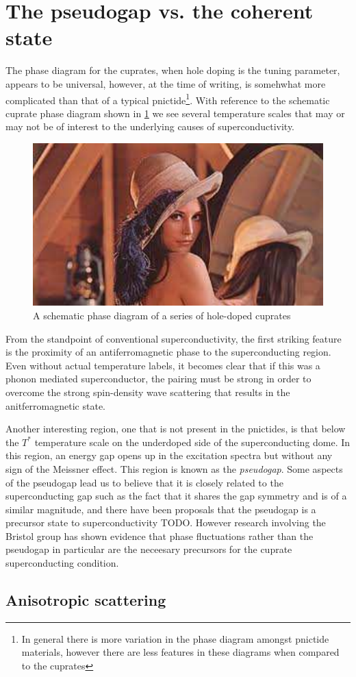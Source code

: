 
\section{The pseudogap vs. the coherent state}

The phase diagram for the cuprates, when hole doping is the tuning parameter, appears to be universal, however, at the time of writing, is somehwhat more complicated than that of a typical pnictide\footnote{In general there is more variation in the phase diagram amongst pnictide materials, however there are less features in these diagrams when compared to the cuprates}. With reference to the schematic cuprate phase diagram shown in \fig\ref{Fig:1:UniversalCupratePhaseDiagram} we see several temperature scales that may or may not be of interest to the underlying causes of \highTc superconductivity.
\begin{figure}[htbp]
    \begin{center}
        \includegraphics[scale=0.7]{Misc/TODO}
        \caption{A schematic phase diagram of a series of hole-doped cuprates}
        \label{Fig:1:UniversalCupratePhaseDiagram}
    \end{center}
\end{figure}
From the standpoint of conventional superconductivity, the first striking feature is the proximity of an antiferromagnetic phase to the superconducting region. Even without actual temperature labels, it becomes clear that if this was a phonon mediated superconductor, the pairing must be strong in order to overcome the strong spin-density wave scattering that results in the anitferromagnetic state.

Another interesting region, one that is not present in the pnictides, is that below the $T^*$ temperature scale on the underdoped side of the superconducting dome. In this region, an energy gap opens up in the excitation spectra but without any sign of the Meissner effect. This region is known as the \textit{pseudogap}. Some aspects of the pseudogap lead us to believe that it is closely related to the superconducting gap such as the fact that it shares the gap symmetry and is of a similar magnitude, and there have been proposals that the pseudogap is a precursor state to superconductivity TODO. However research involving the Bristol group has shown evidence that phase fluctuations rather than the pseudogap in particular are the neceesary precursors for the cuprate superconducting condition\cite{Rourke2011}.

\subsection{Anisotropic scattering}


